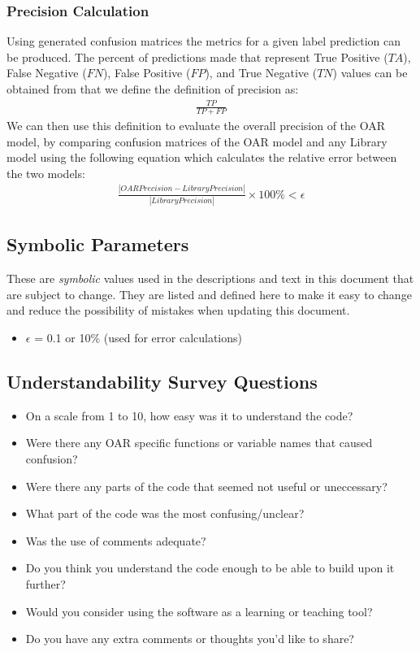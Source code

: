 \documentclass[12pt, titlepage]{article}
\begin{document}
\subsubsection{Precision Calculation} \label{precision_calc}

Using generated confusion matrices the metrics for a given label prediction can be produced. The percent of predictions made
that represent True Positive ($TA$), False Negative ($FN$), False Positive ($FP$), and True Negative ($TN$) values can be obtained 
from that we define the definition of precision as:
\begin{gather}
\frac{TP}{TP + FP}
\end{gather}
We can then use this definition to evaluate the overall precision of the OAR model, by comparing confusion matrices of the OAR model 
and any Library model using the following equation which calculates the relative error between the two models:
\begin{gather}
\frac{|OAR Precision - Library Precision|}{|Library Precision|} \times 100\% < \epsilon
\end{gather}
\subsection{Symbolic Parameters}

These are \textit{symbolic} values used in the descriptions and text in this document that are 
subject to change. They are listed and defined here to make it easy to change and reduce the
possibility of mistakes when updating this document.

\begin{itemize}
  \item $\epsilon$ = 0.1 or 10\% (used for error calculations)
\end{itemize}
    
\subsection{Understandability Survey Questions} \label{survey_understand}

\begin{itemize}
  \item{On a scale from 1 to 10, how easy was it to understand the code?}
  \item{Were there any OAR specific functions or variable names that caused confusion?}
  \item{Were there any parts of the code that seemed not useful or uneccessary?}
  \item{What part of the code was the most confusing/unclear?}
  \item{Was the use of comments adequate?}
  \item{Do you think you understand the code enough to be able to build upon it further?}
  \item{Would you consider using the software as a learning or teaching tool?}
  \item{Do you have any extra comments or thoughts you'd like to share?}
\end{itemize}
\end{document}
